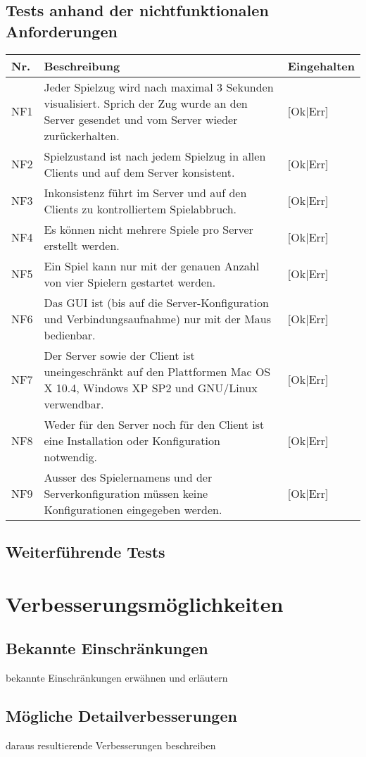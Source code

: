 \documentclass[12pt,halfparskip]{scrartcl}
\begin{document}
\subsection{Tests anhand der nichtfunktionalen Anforderungen}
	\begin {tabular}{l p{11cm} l}
		\toprule
		\textbf{Nr.} & \textbf{Beschreibung} & \textbf{Eingehalten} \\
		\midrule
		NF1 & Jeder Spielzug wird nach maximal 3 Sekunden visualisiert. Sprich der Zug wurde an den Server gesendet und vom Server wieder zurückerhalten. & [Ok|Err] \\
		NF2 & Spielzustand ist nach jedem Spielzug in allen Clients und auf dem Server konsistent. & [Ok|Err] \\
		NF3 & Inkonsistenz führt im Server und auf den Clients zu kontrolliertem Spielabbruch. & [Ok|Err] \\
		NF4 & Es können nicht mehrere Spiele pro Server erstellt werden. & [Ok|Err] \\
		NF5 & Ein Spiel kann nur mit der genauen Anzahl von vier Spielern gestartet werden. & [Ok|Err] \\
		NF6 & Das GUI ist (bis auf die Server-Konfiguration und Verbindungsaufnahme) nur mit der Maus bedienbar. & [Ok|Err] \\
		NF7 & Der Server sowie der Client ist uneingeschränkt auf den Plattformen Mac OS X 10.4, Windows XP SP2 und GNU/Linux verwendbar. & [Ok|Err] \\
		NF8 & Weder für den Server noch für den Client ist eine Installation oder Konfiguration notwendig. & [Ok|Err] \\
		NF9 & Ausser des Spielernamens und der Serverkonfiguration müssen keine Konfigurationen eingegeben werden. & [Ok|Err] \\
		\bottomrule
	\end{tabular}
	
\subsection{Weiterführende Tests}
	
\section{Verbesserungsmöglichkeiten}

\subsection{Bekannte Einschränkungen}
bekannte Einschränkungen erwähnen und erläutern

\subsection{Mögliche Detailverbesserungen}
daraus resultierende Verbesserungen beschreiben
\end{document}
